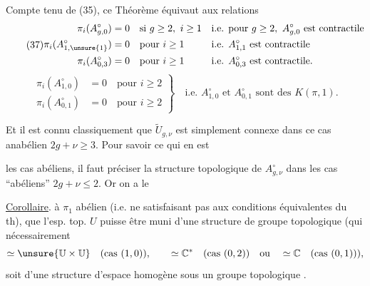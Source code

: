 Compte tenu de (35), ce Théorème équivaut aux relations
\[
\tag{37}
\begin{aligned}
\pi_i(A_{g,0}^{\circ})&=0\quad\text{si }g\geq2,\ i\geq1
&&\text{i.e. pour }g\geq2,\ A_{g,0}^{\circ}\text{ est contractile}\\
\pi_i(A_{1,\unsure{1}}^{\circ})&=0\quad\text{pour }i\geq1
&&\text{i.e. }A_{1,1}^{\circ}\text{ est contractile}\\
\pi_i(A_{0,3}^{\circ})&=0\quad\text{pour }i\geq1
&&\text{i.e. }A_{0,3}^{\circ}\text{ est contractile}.
\end{aligned}
\]
\[
\tag{38}
\left.\begin{aligned}
\pi_i(A_{1,0}^{\circ})&=0\quad\text{pour }i\geq2\\
\pi_i(A_{0,1}^{\circ})&=0\quad\text{pour }i\geq2
\end{aligned}\right\}
\quad\text{i.e. }A_{1,0}^{\circ}\text{ et }A_{0,1}^{\circ}\text{ sont des }K(\pi,1).
\]

Et il est connu classiquement que $\widetilde U_{g,\nu}$ est simplement connexe dans ce cas anabélien $2g+\nu\geq3$. Pour savoir ce qui en est

 les cas abéliens, il faut préciser la structure topologique de $A_{g,\nu}^{\circ}$ dans les  cas ``abéliens'' $2g+\nu\leq2$. Or on a le

\uline{Corollaire}.   à $\pi_1$ abélien (i.e. ne satisfaisant pas aux conditions équivalentes du th),  que l'esp. top. $U$   puisse être muni d'une structure de groupe topologique (qui nécessairement
\[
\simeq\unsure{\mathbb U\times\mathbb U}\quad\text{(cas }(1,0)\text{)},\qquad
\simeq\mathbb C^*\quad\text{(cas }(0,2)\text{)}\quad\text{ou}\quad
\simeq\mathbb C\quad\text{(cas }(0,1)\text{)}),
\]
soit d'une structure d'espace homogène sous un groupe topologique .

